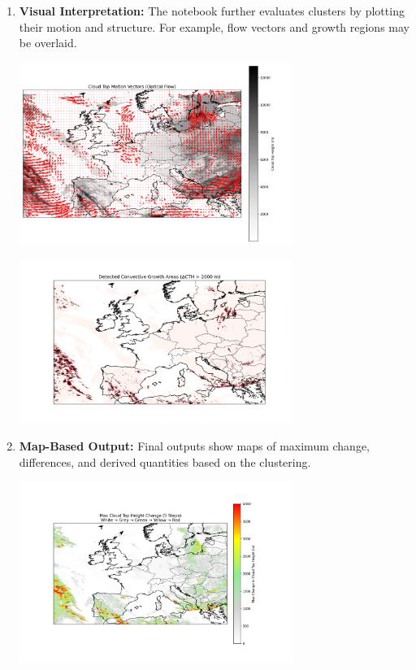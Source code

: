 \begin{enumerate}[label=\textbf{Step \arabic*:}, leftmargin=2cm]
\item \textbf{Visual Interpretation:} The notebook further evaluates clusters by plotting their motion and structure. For example, flow vectors and growth regions may be overlaid.

\begin{center}
    \includegraphics[width=0.7\textwidth]{images/cth_motion_vectors.png}
\end{center}

\begin{center}
    \includegraphics[width=0.7\textwidth]{images/cth_convective_growth.png}
\end{center}

\item \textbf{Map-Based Output:} Final outputs show maps of maximum change, differences, and derived quantities based on the clustering.

\begin{center}
    \includegraphics[width=0.7\textwidth]{images/cth_max_change_map.png}
\end{center}


\end{enumerate}
